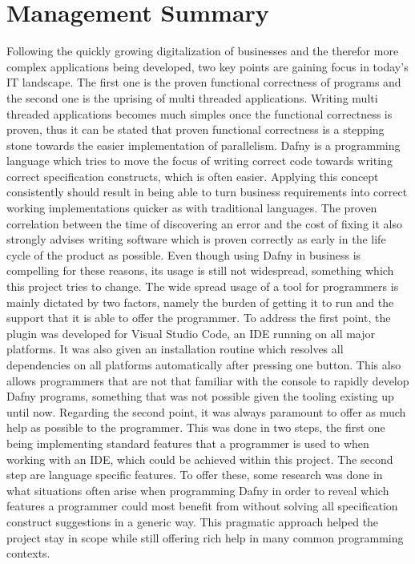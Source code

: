 \section{Management Summary}
Following the quickly growing digitalization of businesses and the therefor more complex applications being developed, two key points are gaining focus in today's IT landscape. The first one is the proven functional correctness of programs and the second one is the uprising of multi threaded applications. Writing multi threaded applications becomes much simples once the functional correctness is proven, thus it can be stated that proven functional correctness is a stepping stone towards the easier implementation of parallelism. Dafny is a programming language which tries to move the focus of writing correct code towards writing correct specification constructs, which is often easier. Applying this concept consistently should result in being able to turn business requirements into correct working implementations quicker as with traditional languages. The proven correlation between the time of discovering an error and the cost of fixing it also strongly advises writing software which is proven correctly as early in the life cycle of the product as possible. Even though using Dafny in business is compelling for these reasons, its usage is still not widespread, something which this project tries to change.\newline
The wide spread usage of a tool for programmers is mainly dictated by two factors, namely the burden of getting it to run and the support that it is able to offer the programmer. \newline
To address the first point, the plugin was developed for Visual Studio Code, an IDE running on all major platforms. It was also given an installation routine which resolves all dependencies on all platforms automatically after pressing one button. This also allows programmers that are not that familiar with the console to rapidly develop Dafny programs, something that was not possible given the tooling existing up until now. \newline
Regarding the second point, it was always paramount to offer as much help as possible to the programmer. This was done in two steps, the first one being implementing standard features that a programmer is used to when working with an IDE, which could be achieved within this project. The second step are language specific features. To offer these, some research was done in what situations often arise when programming Dafny in order to reveal which features a programmer could most benefit from without solving all specification construct suggestions in a generic way. This pragmatic approach helped the project stay in scope while still offering rich help in many common programming contexts. \newline
